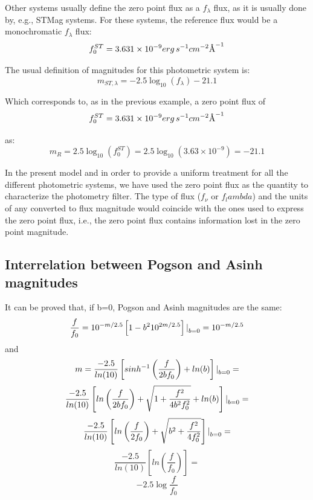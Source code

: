 \documentclass[11pt,a4paper]{ivoa}
\newcommand{\angstrom}{\mbox{\normalfont\AA}}
\begin{document}
\begin{appendices}
Other systems usually define the zero point flux as a $f_\lambda $ flux, as 
it is usually done by, e.g., STMag systems. For these systems, the reference 
flux would be a monochromatic $f_\lambda $ flux:
\begin{equation} \label{eq:40}
f_0 ^{ST} = 3.631 \times 10^{-9} erg\, s^{-1} cm^{-2} \angstrom ^{-1}
\end{equation}

The usual definition of magnitudes for this photometric system is:
\begin{equation} \label{eq:41}
m_{ST,\lambda }=-2.5\log_{10} (f_\lambda )-21.1
\end{equation}

Which corresponds to, as in the previous example, a zero point flux of
\begin{equation} \label{eq:42}
f_0 ^{ST}=3.631 \times 10^{-9} erg\, s^{-1} cm^{-2} \angstrom ^{-1}
\end{equation}

as:
\begin{equation} \label{eq:43}
m_R =2.5\log_{10} (f_0 ^{ST})=2.5\log_{10} (3.63\times 10^{-9})=-21.1
\end{equation}

In the present model and in order to provide a uniform treatment for all the 
different photometric systems, we have used the zero point flux as the quantity 
to characterize the photometry filter. The type of flux ($f_\nu $ or $f_lambda $) 
and the units of any converted to flux magnitude would coincide with the ones 
used to express the zero point flux, i.e., the zero point flux contains information 
lost in the zero point magnitude.
\par

\subsection{Interrelation between Pogson and Asinh magnitudes}
It can be proved that, if b=0, Pogson and Asinh magnitudes are the same:
\begin{equation} \label{eq:44}
\frac{f}{f_0}=10^{-m/2.5}\left[ 1-b^2 10^{2m/2.5}\right] \text{\textbar}_{b=0} =10^{-m/2.5}
\end{equation}
and
\begin{equation} \label{eq:45}
m=\frac{-2.5}{ln(10)}\left[ sinh^{-1} \left(\frac{f}{2bf_0}\right) + ln(b)\right] \text{\textbar}_{b=0} =
\end{equation}
\[
\frac{-2.5}{ln(10)}\left[ ln\left(\frac{f}{2bf_0}\right) + \sqrt{1+\frac{f^2}{4b^2 f_0^2}} + ln(b)\right] \text{\textbar}_{b=0} =
\]
\[
\frac{-2.5}{ln(10)}\left[ ln\left(\frac{f}{2f_0}\right) + \sqrt{b^2+\frac{f^2}{4 f_0^2}}\right] \text{\textbar}_{b=0} =
\]
\[
\frac{-2.5}{ln(10)}\left[ ln(\frac{f}{f_0}) \right] =
\]
\[
-2.5\log{\frac{f}{f_0}}
\]



\end{appendices}
\end{document}
